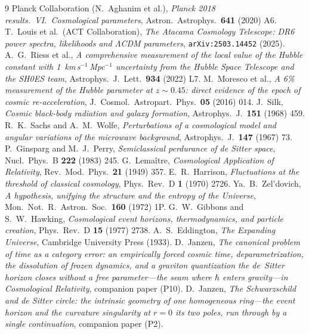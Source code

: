 \documentclass[11pt,a4paper]{article}
\theoremstyle{plain}
\theoremstyle{definition}
\theoremstyle{remark}
\begin{document}
\begin{thebibliography}{9}
 Planck Collaboration (N.~Aghanim et al.), \emph{Planck 2018 results.~VI.~Cosmological parameters}, Astron.\ Astrophys.\ \textbf{641} (2020) A6.
 T.~Louis et al.\ (ACT Collaboration), \emph{The Atacama Cosmology Telescope: DR6 power spectra, likelihoods and $\Lambda$CDM parameters}, \texttt{arXiv:2503.14452} (2025).
 A.~G.~Riess et al., \emph{A comprehensive measurement of the local value of the Hubble constant with 1~km\,s$^{-1}$\,Mpc$^{-1}$ uncertainty from the Hubble Space Telescope and the SH0ES team}, Astrophys.\ J.\ Lett.\ \textbf{934} (2022) L7.
 M.~Moresco et al., \emph{A 6\% measurement of the Hubble parameter at $z\sim0.45$: direct evidence of the epoch of cosmic re-acceleration}, J.\ Cosmol.\ Astropart.\ Phys.\ \textbf{05} (2016) 014.
 J.~Silk, \emph{Cosmic black-body radiation and galaxy formation}, Astrophys.\ J.\ \textbf{151} (1968) 459.
 R.~K.~Sachs and A.~M.~Wolfe, \emph{Perturbations of a cosmological model and angular variations of the microwave background}, Astrophys.\ J.\ \textbf{147} (1967) 73.
 P.~Ginsparg and M.~J.~Perry, \emph{Semiclassical perdurance of de Sitter space}, Nucl.\ Phys.\ B \textbf{222} (1983) 245.
 G.~Lema\^itre, \emph{Cosmological Application of Relativity}, Rev.\ Mod.\ Phys.\ \textbf{21} (1949) 357.
 E.~R.~Harrison, \emph{Fluctuations at the threshold of classical cosmology}, Phys.\ Rev.\ D \textbf{1} (1970) 2726.
 Ya.~B.~Zel'dovich, \emph{A hypothesis, unifying the structure and the entropy of the Universe}, Mon.\ Not.\ R.\ Astron.\ Soc.\ \textbf{160} (1972) 1P.
 G.~W.~Gibbons and S.~W.~Hawking, \emph{Cosmological event horizons, thermodynamics, and particle creation}, Phys.\ Rev.\ D \textbf{15} (1977) 2738.
 A.~S.~Eddington, \emph{The Expanding Universe}, Cambridge University Press (1933).
D.~Janzen,
\emph{The canonical problem of time as a category error: an empirically forced cosmic time, deparametrization, the dissolution of frozen dynamics, and a graviton quantization the de~Sitter horizon closes without a free parameter---the seam where $\hbar$ enters gravity---in Cosmological Relativity}, companion paper (P10).
D.~Janzen,
\emph{The Schwarzschild and de Sitter circle: the intrinsic geometry of one homogeneous ring---the event horizon and the curvature singularity at $r=0$ its two poles, run through by a single continuation}, companion paper (P2).

\end{thebibliography}
\end{document}
